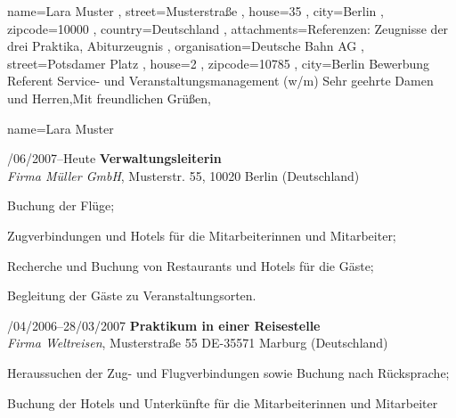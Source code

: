 \documentclass[a4paper, 12pt]{classycv}
\begin{document}
\begin{CoverLetter}[%
	submitter information line color=none%
	, recipient information line color=none%
	, has body separator=no%
	, has footer separator=no%
]{%
	name=Lara Muster%
	, street=Musterstraße%
	, house=35%
	, city=Berlin%
	, zipcode=10000%
	, country=Deutschland%
	, attachments={Referenzen: Zeugnisse der drei Praktika, Abiturzeugnis}
}{%
	, organisation=Deutsche Bahn AG%
	, street=Potsdamer Platz%
	, house=2%
	, zipcode=10785%
	, city=Berlin%
}{Bewerbung Referent Service- und Veranstaltungsmanagement (w/m) }{Sehr geehrte Damen und Herren,}{Mit freundlichen Grüßen,}%
\blindtext[1]%
\end{CoverLetter}

\begin{Resume}{%
	name=Lara Muster%
}%
%
%
\begin{Entry}{%
    \color{accent-color}/06/2007–Heute%
}{%
    \textbf{Verwaltungsleiterin}\\\textit{Firma Müller GmbH}, Musterstr. 55, 10020 Berlin (Deutschland)%
}%
    \begin{List}[skip above=0pt]%
		\item Buchung der Flüge;
		\item Zugverbindungen und Hotels für die Mitarbeiterinnen und Mitarbeiter;
		\item Recherche und Buchung von Restaurants und Hotels für die Gäste;
        \item Begleitung der Gäste zu Veranstaltungsorten.
	\end{List}
\end{Entry}
%
\begin{Entry}{%
    \color{accent-color}/04/2006–28/03/2007%
}{%
    \textbf{Praktikum in einer Reisestelle}\\\textit{Firma Weltreisen}, Musterstraße 55 DE-35571 Marburg (Deutschland)%
}%
    \begin{List}[skip above=0pt]%
        \item Heraussuchen der Zug- und Flugverbindungen sowie Buchung nach Rücksprache;
        \item Buchung der Hotels und Unterkünfte für die Mitarbeiterinnen und Mitarbeiter
    \end{List}

\end{Entry}
\end{Resume}
\end{document}
